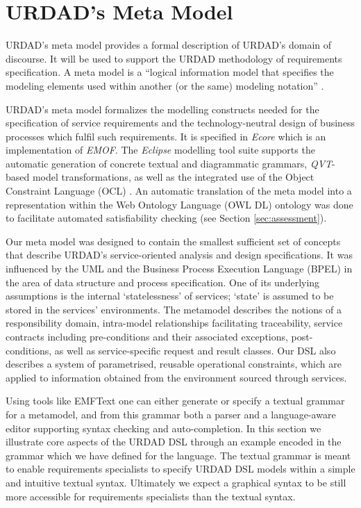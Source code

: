 \section{URDAD's Meta Model \label{sec:metamodel}}

URDAD's meta model provides a formal description of URDAD's domain of discourse. It will be used to support the URDAD methodology of requirements specification. A meta model is a ``logical information model that specifies the modeling elements used within another (or the same) modeling notation'' \cite{_ieee_2003}. 

URDAD's meta model formalizes the modelling constructs needed for the specification of service requirements and the technology-neutral design of business processes which fulfil such requirements. It is specified in \emph{Ecore} which is an implementation of \emph{EMOF}. The \emph{Eclipse} modelling tool suite\cite{gronback_model_2008} supports the automatic generation of concrete textual and diagrammatic grammars, \emph{QVT}-based model transformations, as well as the integrated use of the Object Constraint Language (OCL) \cite{_object_2010}. An automatic translation of the meta model into a representation within the Web Ontology Language (OWL DL) ontology was done to facilitate automated satisfiability checking (see Section \ref{sec:assessment}).

Our meta model was designed to contain the smallest sufficient set of concepts that describe URDAD's service-oriented analysis and design specifications.  It was influenced by the UML and the Business Process Execution Language (BPEL) in the area of data structure and process specification. One of its underlying assumptions is the internal `statelessness' of services; `state' is assumed to be stored in the services' environments. The metamodel describes the notions of a responsibility domain, intra-model relationships facilitating traceability, service contracts including pre-conditions and their associated exceptions, post-conditions, as well as service-specific request and result classes. Our DSL also describes a system of parametrised, reusable operational constraints, which are applied to information obtained from the environment sourced through services.

Using tools like EMFText \cite{heidenreich_derivation_2009} one can either generate or specify a textual grammar for a metamodel, and from this grammar both a parser and a language-aware editor supporting syntax checking and auto-completion. In this section we illustrate core aspects of the URDAD DSL through an example encoded in the grammar which we have defined for the language. The textual grammar is meant to enable requirements specialists to specify URDAD DSL models within a simple and intuitive textual syntax. Ultimately we expect a graphical syntax to be still more accessible for requirements specialists than the textual syntax.

